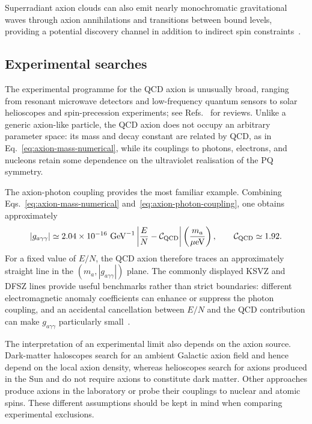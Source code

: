\documentclass[review]{elsarticle}
\numberwithin{equation}{section}
\numberwithin{table}{section}
\numberwithin{figure}{section}
\def\C{\mathcal{C}}
\begin{document}
Superradiant axion clouds can also emit nearly monochromatic gravitational waves through axion annihilations and transitions between bound levels, providing a potential discovery channel in addition to indirect spin constraints~\cite{Arvanitaki:2010sy,Arvanitaki:2014wva,Arvanitaki:2016qwi}. 

\subsection{Experimental searches}
\label{sec:axion-experimental-searches}

The experimental programme for the QCD axion is unusually broad, ranging from resonant microwave detectors and low-frequency quantum sensors to solar helioscopes and spin-precession experiments; see Refs.~\cite{Graham:2015ouw,Irastorza:2018dyq,Baryakhtar:2025jwh} for reviews. Unlike a generic axion-like particle, the QCD axion does not occupy an arbitrary parameter space: its mass and decay constant are related by QCD, as in Eq.~\eqref{eq:axion-mass-numerical}, while its couplings to photons, electrons, and nucleons retain some dependence on the ultraviolet realisation of the PQ symmetry.

The axion-photon coupling provides the most familiar example. Combining Eqs.~\eqref{eq:axion-mass-numerical} and~\eqref{eq:axion-photon-coupling}, one obtains approximately
\begin{align}
    |g_{a\gamma\gamma}|
    \simeq
    2.04\times 10^{-16}\ {\rm GeV}^{-1}
    \left|
        \frac{E}{N}-\C_{\rm QCD}
    \right|
    \left(
        \frac{m_a}{\mu{\rm eV}}
    \right),
    \qquad
    \C_{\rm QCD}\simeq 1.92.
    \label{eq:qcd-axion-photon-trajectory}
\end{align}
For a fixed value of $E/N$, the QCD axion therefore traces an approximately straight line in the $(m_a,|g_{a\gamma\gamma}|)$ plane. The commonly displayed KSVZ and DFSZ lines provide useful benchmarks rather than strict boundaries: different electromagnetic anomaly coefficients can enhance or suppress the photon coupling, and an accidental cancellation between $E/N$ and the QCD contribution can make $g_{a\gamma\gamma}$ particularly small~\cite{Agrawal:2017cmd}.

The interpretation of an experimental limit also depends on the axion source. Dark-matter haloscopes search for an ambient Galactic axion field and hence depend on the local axion density, whereas helioscopes search for axions produced in the Sun and do not require axions to constitute dark matter. Other approaches produce axions in the laboratory or probe their couplings to nuclear and atomic spins. These different assumptions should be kept in mind when comparing experimental exclusions.
\end{document}
